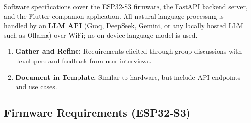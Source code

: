 \documentclass[12pt,a4paper]{article}
\begin{document}
Software specifications cover the ESP32-S3 firmware, the FastAPI backend server,
and the Flutter companion application. All natural language processing is handled
by an \textbf{LLM API} (Groq, DeepSeek, Gemini, or any locally hosted LLM such
as Ollama) over WiFi; no on-device language model is used.

\begin{enumerate}[leftmargin=*]
\item \textbf{Gather and Refine:} Requirements elicited through group
      discussions with developers and feedback from user interviews.
\item \textbf{Document in Template:} Similar to hardware, but include API
      endpoints and use cases.
\end{enumerate}

\subsection*{Firmware Requirements (ESP32-S3)}
\end{document}
